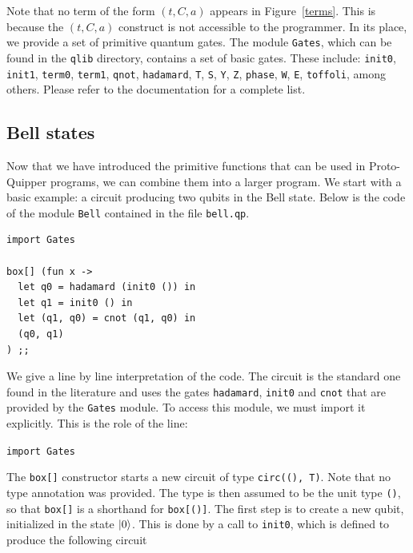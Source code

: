 Note that no term of the form $(t,C,a)$ appears in
Figure~\hyperref[terms]{\ref*{terms}}. This is because the $(t,C,a)$
construct is
not accessible to the programmer. In its place, we provide a set of 
primitive quantum gates. The module \verb#Gates#, which can be found in the 
\verb#qlib# directory, contains a set of basic gates. 
These include: \verb#init0#, \verb#init1#, \verb#term0#, \verb#term1#, 
\verb#qnot#, \verb#hadamard#, \verb#T#, \verb#S#, \verb#Y#, \verb#Z#, 
\verb#phase#, \verb#W#, \verb#E#, \verb#toffoli#, among others. Please
refer to the documentation for a complete list.

\subsection{Bell states}
\label{ssec-quipper-by-e}

Now that we have introduced the primitive functions that can be used in Proto-Quipper programs, we can combine them into a larger program. We start with 
a basic example: a circuit producing two qubits in the Bell state. Below is
the code of the module \verb#Bell# contained in the file \verb#bell.qp#.

\begin{splitcode}
\begin{verbatim}
import Gates

box[] (fun x ->
  let q0 = hadamard (init0 ()) in
  let q1 = init0 () in
  let (q1, q0) = cnot (q1, q0) in
  (q0, q1)
) ;;
\end{verbatim}
  \split {}
\end{splitcode}


We give a line by line interpretation of the code. The circuit is the standard one found in the literature and uses the gates \verb#hadamard#, 
\verb#init0# and \verb#cnot# that are provided by the \verb#Gates# module. 
To access this module, we must import it explicitly. This is the role of 
the line:
\begin{center}
  \verb#import Gates#
\end{center}
The \verb#box[]# constructor starts a new circuit of type \verb#circ((), T)#. 
Note that no type annotation was provided. The type is then assumed to be 
the unit type \verb#()#, so that \verb#box[]# is a shorthand for 
\verb#box[()]#. The first step is to create a new qubit, initialized in the 
state ${\left\vert{0}\right\rangle}$. This is done by a call to \verb#init0#, which is
defined to produce the following circuit

